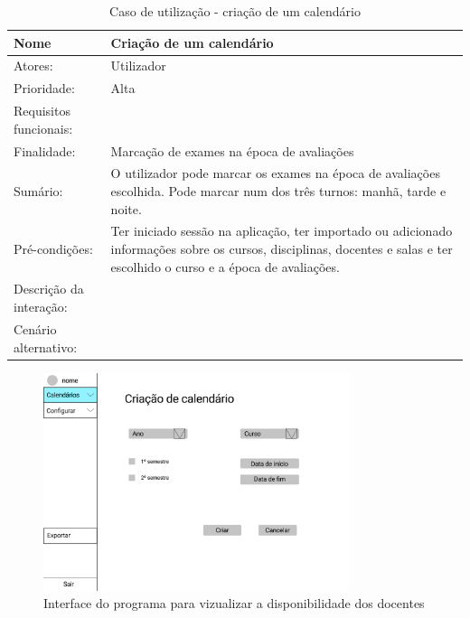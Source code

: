 \documentclass[11pt, twoside]{report}
\begin{document}
\begin{table}[H]
	\caption{Caso de utilização - criação de um calendário}
	\begin{center}	
		\begin{tabularx}{\textwidth}{|l|X|}
			\hline
			\textbf{Nome }	& \textbf{Criação de um calendário} \\
			\hline
			Atores: & Utilizador\\
			\hline
			Prioridade: &  Alta\\
			\hline
			Requisitos funcionais:&  \\
			\hline
			Finalidade: & Marcação de exames na época de avaliações\\
			\hline
			Sumário: & O utilizador pode marcar os exames na época de avaliações escolhida. Pode marcar num dos três turnos: manhã, tarde e noite.\\
			\hline
			Pré-condições: & Ter iniciado sessão na aplicação, ter importado ou adicionado informações sobre os cursos, disciplinas, docentes e salas e ter escolhido o curso e a época de avaliações.\\
			\hline
			Descrição da interação: &  \\
			\hline
			Cenário alternativo: &\\
			\hline
		\end{tabularx}
	\end{center}
\end{table}

\begin{figure}[H] 
	\centering 
	\includegraphics[width=0.8\textwidth,height=0.8\textheight,keepaspectratio]{image/prototipowireframes/criarcalendario}
	\caption{Interface do programa para vizualizar a disponibilidade dos docentes}
\end{figure}
\end{document}
